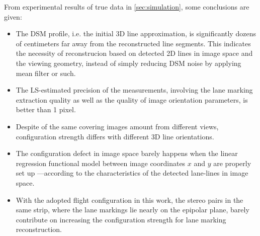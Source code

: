 From experimental results of true data in \cref{sec:simulation}, some conclusions are given:
\begin{itemize}
	\item The DSM profile, i.e. the initial 3D line approximation, is significantly dozens of centimeters far away from the reconstructed line segments. This indicates the necessity of reconstrucion based on detected 2D lines in image space and the viewing geometry, instead of simply reducing DSM noise by applying mean filter or such.
	
	\item The LS-estimated precision of the measurements, involving the lane marking extraction quality as well as the quality of image orientation parameters, is better than 1 pixel.
	
	\item Despite of the same covering images amount from different views, configuration strength differs with different 3D line orientations.
	
	\item The configuration defect in image space %
	barely happens when the linear regression functional model between image coordinates $x$ and $y$ are properly set up ---according to the characteristics of the detected lane-lines in image space.
	
	\item  %
	With the adopted flight configuration in this work, the stereo pairs in the same strip, where the lane markings lie nearly on the epipolar plane, barely contribute on increasing the configuration strength for lane marking reconstruction. 
	
\end{itemize}




